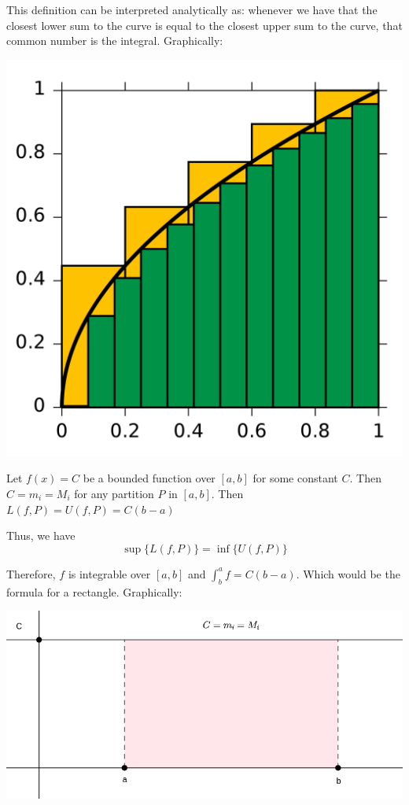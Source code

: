 \documentclass{report}
\begin{document}
    This definition can be interpreted analytically as: whenever we have that the closest lower sum to the curve is equal to the closest upper sum to the curve, that common number is the integral. Graphically:

    \begin{Figure}
        \begin{center}
        \includegraphics[width=.5\textwidth]{images/darbouxintegral.png}
        \end{center}
    \end{Figure}

    \begin{Example}
        Let $f(x) = C$ be a bounded function over $[a,b]$ for some constant $C$. Then $C = m_i = M_i$ for any partition $P$ in $[a,b]$. Then
        $L(f, P) = U(f, P) = C(b-a)$

        Thus, we have
        $$\sup\{L(f, P)\} = \inf\{U(f, P)\}$$

        Therefore, $f$ is integrable over $[a,b]$ and $\int_{b}^{a}f = C(b-a)$. Which would be the formula for a rectangle. Graphically:

        \begin{center}
            \includegraphics[width=1\textwidth]{images/integralconstant.png}
        \end{center}
    \end{Example}
\end{document}
